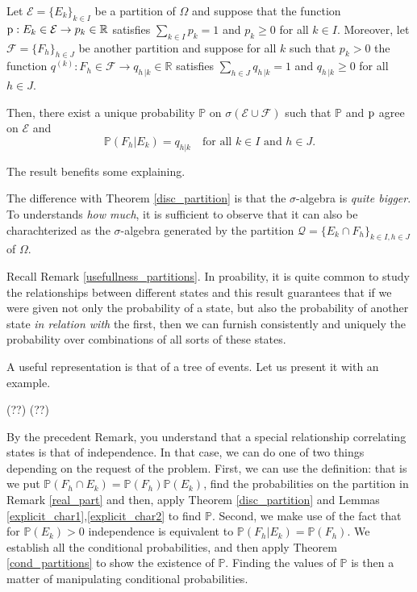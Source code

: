 \begin{my_corollary}
	\label{cond_partitions}
	Let $\mathcal{E}=\{ E_k \}_{k\in I}$ be a partition of $\Omega$ and suppose that the function $\mathrm{p}:E_k \in \mathcal{E} \to p_k \in \mathbb{R}$ satisfies $\sum_{k\in I} p_k=1$ and $p_k\geq0$ for all $k \in I$. Moreover, let $\mathcal{F}=\{ F_h \}_{h\in J}$ be another partition and suppose for all $k$ such that $p_k > 0$ the function $q^{(k)}:F_h \in \mathcal{F} \to q_{h\,|k} \in \mathbb{R}$ satisfies $\sum_{h \in J} q_{h\,|k}=1$ and $q_{h\,|k}\geq0$ for all $h \in J$.

	Then, there exist a unique probability $\mathbb{P}$ on $\sigma(\mathcal{E}\cup\mathcal{F})$ such that $\mathbb{P}$ and $\mathrm{p}$ agree on $\mathcal{E}$ and
	\[
		\mathbb{P}\left( F_h | E_k \right) = q_{h|k} \quad \text{for all } k \in I \text{ and } h \in J.
	\]
\end{my_corollary}
The result benefits some explaining. 
\begin{my_remark}
	\label{real_part}
	The difference with Theorem \ref{disc_partition} is that the $\sigma$-algebra is \textit{quite bigger}. To understands \textit{how much}, it is sufficient to observe that it can also be charachterized as the $\sigma$-algebra generated by the partition $\mathcal{Q}=\{ E_k \cap F_h\}_{k\in I,h\in J}$ of $\Omega$. 
\end{my_remark}	
\begin{my_remark}
	\label{usefull_condpart}
	Recall Remark \ref{usefullness_partitions}. In proability, it is quite common to study the relationships between different states and this result guarantees that if we were given not only the probability of a state, but also the probability of another state \textit{in relation with} the first, then we can furnish consistently and uniquely the probability over combinations of all sorts of these states.
\end{my_remark}
A useful representation is that of a tree of events. Let us present it with an example.
\begin{my_example}
	(??)%
	(??)%
\end{my_example}
\begin{my_remark}
	By the precedent Remark, you understand that a special relationship correlating states is that of independence. In that case, we can do one of two things depending on the request of the problem. First, we can use the definition: that is we put $\mathbb{P}(F_h \cap E_k)=\mathbb{P}(F_h)\mathbb{P}(E_k)$, find the probabilities on the partition in Remark \ref{real_part} and then, apply Theorem \ref{disc_partition} and Lemmas \ref{explicit_char1},\ref{explicit_char2} to find $\mathbb{P}$. Second, we make use of the fact that for $\mathbb{P}(E_k)>0$ independence is equivalent to $\mathbb{P}(F_h|E_k)=\mathbb{P}(F_h)$. We establish all the conditional probabilities, and then apply Theorem \ref{cond_partitions} to show the existence of $\mathbb{P}$. Finding the values of $\mathbb{P}$ is then a matter of manipulating conditional probabilities.
\end{my_remark}

